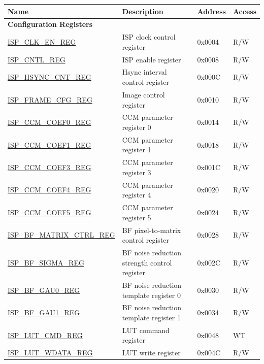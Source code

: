 \begin{longtable}{ | p{6cm} | p{7.2cm} | p{1.3cm} | p{1cm} | }
\hline\rowcolor{lightgray}
{\bfseries Name} & {\bfseries Description} &  {\bfseries Address} & {\bfseries Access} \\ \hline
\endhead
\multicolumn{4}{|l|}{\textbf{Configuration Registers}} \\ \hline
\hyperref[regdesc:ISPCLKENREG]{ISP\_CLK\_EN\_REG} & ISP clock control register & 0x0004 & R/W \\ \hline
\hyperref[regdesc:ISPCNTLREG]{ISP\_CNTL\_REG} & ISP enable register & 0x0008 & R/W \\ \hline
\hyperref[regdesc:ISPHSYNCCNTREG]{ISP\_HSYNC\_CNT\_REG} & Hsync interval control register & 0x000C & R/W \\ \hline
\hyperref[regdesc:ISPFRAMECFGREG]{ISP\_FRAME\_CFG\_REG} & Image control register & 0x0010 & R/W \\ \hline
\hyperref[regdesc:ISPCCMCOEF0REG]{ISP\_CCM\_COEF0\_REG} & CCM parameter register 0 & 0x0014 & R/W \\ \hline
\hyperref[regdesc:ISPCCMCOEF1REG]{ISP\_CCM\_COEF1\_REG} & CCM parameter register 1 & 0x0018 & R/W \\ \hline
\hyperref[regdesc:ISPCCMCOEF3REG]{ISP\_CCM\_COEF3\_REG} & CCM parameter register 3 & 0x001C & R/W \\ \hline
\hyperref[regdesc:ISPCCMCOEF4REG]{ISP\_CCM\_COEF4\_REG} & CCM parameter register 4 & 0x0020 & R/W \\ \hline
\hyperref[regdesc:ISPCCMCOEF5REG]{ISP\_CCM\_COEF5\_REG} & CCM parameter register 5 & 0x0024 & R/W \\ \hline
\hyperref[regdesc:ISPBFMATRIXCTRLREG]{ISP\_BF\_MATRIX\_CTRL\_REG} & BF pixel-to-matrix control register & 0x0028 & R/W \\ \hline
\hyperref[regdesc:ISPBFSIGMAREG]{ISP\_BF\_SIGMA\_REG} & BF noise reduction strength control register & 0x002C & R/W \\ \hline
\hyperref[regdesc:ISPBFGAU0REG]{ISP\_BF\_GAU0\_REG} & BF noise reduction template register 0 & 0x0030 & R/W \\ \hline
\hyperref[regdesc:ISPBFGAU1REG]{ISP\_BF\_GAU1\_REG} & BF noise reduction template register 1 & 0x0034 & R/W \\ \hline
\hyperref[regdesc:ISPLUTCMDREG]{ISP\_LUT\_CMD\_REG} & LUT command register & 0x0048 & WT \\ \hline
\hyperref[regdesc:ISPLUTWDATAREG]{ISP\_LUT\_WDATA\_REG} & LUT write register & 0x004C & R/W \\ \hline

\end{longtable}
